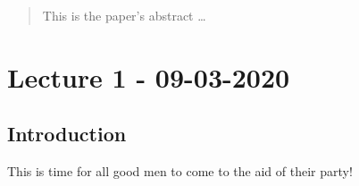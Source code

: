 \documentclass[12pt]{article}
\begin{document}
\maketitle


\begin{abstract}
This is the paper's abstract \ldots
\end{abstract}

\section{Lecture 1 - 09-03-2020}

\subsection{Introduction}
This is time for all good men to come to the aid of their party!
\end{document}
